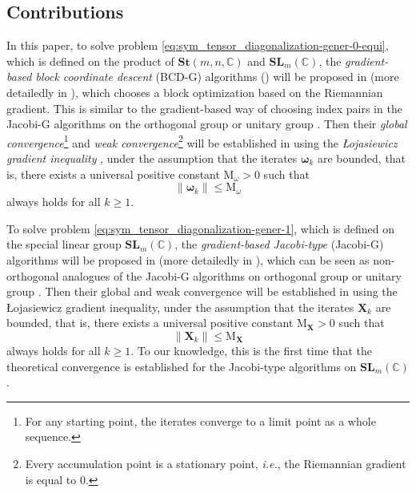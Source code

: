 \documentclass[final,onefignum,onetabnum]{siamart190516}
\newcommand{\matr}[1]{\boldsymbol{#1}}
\newcommand{\CC}{\mathbb{C}}
\newcommand{\SL}{\mathbf{SL}}
\newcommand{\St}{\mathbf{St}}
\begin{document}
\subsection{Contributions}

In this paper, 
to solve problem \cref{eq:sym_tensor_diagonalization-gener-0-equi}, which is defined on the product of $\St(m,n,\CC)$ and $\SL_{m}(\CC)$, the \emph{gradient-based block coordinate descent} (BCD-G) algorithms () will be proposed in  (more detailedly in ), which chooses a block  optimization based on the Riemannian gradient.
This is similar to the gradient-based way of choosing index pairs in the Jacobi-G algorithms on the orthogonal group \cite{IshtAV13:simax,LUC2017globally} or unitary group \cite{ULC2019}. 
Then their \emph{global convergence}\footnote{For any starting point, the iterates converge to a limit point as a whole sequence.} and \emph{weak convergence}\footnote{Every accumulation point is a stationary point, \emph{i.e.}, the Riemannian gradient is equal to 0.} will be established in  using the \emph{\L{}ojasiewicz gradient inequality} \cite{loja1965ensembles,lojasiewicz1993geometrie,absil2005convergence,Usch15:pjo}, under the assumption that the iterates $\matr{\omega}_{k}$ are bounded, that is, 
there exists a universal positive constant  $\mathrm{M}_{\omega}>0$ such that 
\begin{equation}\label{eq:condi_bounded_X_gene}
\|\matr{\omega}_{k}\|\leq \mathrm{M}_{\omega}
\end{equation}
always holds for all $k\geq 1$. 

To solve problem \cref{eq:sym_tensor_diagonalization-gener-1}, which is defined on the special linear group $\SL_{m}(\CC)$, the \emph{gradient-based Jacobi-type} (Jacobi-G) algorithms will be proposed in   (more detailedly in ), which can be seen as non-orthogonal analogues of the Jacobi-G algorithms on orthogonal group \cite{IshtAV13:simax,LUC2017globally} or unitary group \cite{ULC2019}.
Then their global and weak convergence will be established in  using the \L{}ojasiewicz gradient inequality, under the assumption that the iterates $\matr{X}_{k}$ are bounded, that is, 
there exists a universal positive constant $\mathrm{M}_{\matr{X}}>0$ such that 
\begin{equation}\label{eq:condi_bounded_X_gene-2}
\|\matr{X}_{k}\|\leq \mathrm{M}_{\matr{X}}
\end{equation}
always holds for all $k\geq 1$. 
To our knowledge, this is the first time that the theoretical convergence is established for the Jacobi-type algorithms on $\SL_{m}(\CC)$. 
\end{document}
